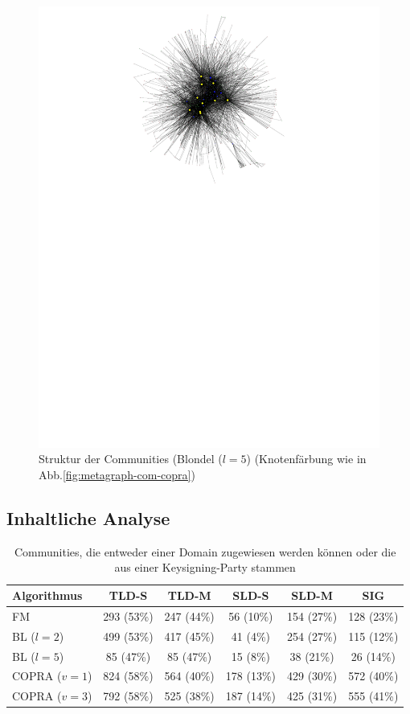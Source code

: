 \begin{figure}[h!]
  \centering
  \includegraphics[scale=1.6]{images/metagraph-blondel2-minsize4.pdf}
  \caption{Struktur der Communities (Blondel ($l=5$) (Knotenfärbung
    wie in Abb.\ref{fig:metagraph-com-copra})}
  \label{fig:metagraph-com-blondel2}
\end{figure}

\subsection{Inhaltliche Analyse}
\label{sec:inhaltliche-analyse}

\begin{table}[t]
  \centering
  \footnotesize
  \begin{tabular}{l|c|c|c|c|c}
    Algorithmus & TLD-S & TLD-M & SLD-S & SLD-M & SIG \\
    \hline
    FM & 293 (53\%) & 247 (44\%) & 56 (10\%) & 154 (27\%) & 128
    (23\%) \\
    \hline
    BL ($l=2$) & 499 (53\%) & 417 (45\%) & 41 (4\%) & 254 (27\%) & 115 (12\%) \\
    BL ($l=5$) & 85 (47\%) & 85 (47\%) & 15 (8\%) & 38 (21\%) & 26 (14\%) \\
    \hline
    COPRA ($v=1$) & 824 (58\%) & 564 (40\%) & 178 (13\%) & 429 (30\%)
    & 572 (40\%) \\
    COPRA ($v=3$) & 792 (58\%) & 525 (38\%) & 187 (14\%) & 425 (31\%) & 555
    (41\%)
  \end{tabular}
  \caption{Communities, die entweder einer Domain zugewiesen werden
    k\"onnen oder die aus einer Keysigning-Party stammen}
  \label{tab:assign}
\end{table}

